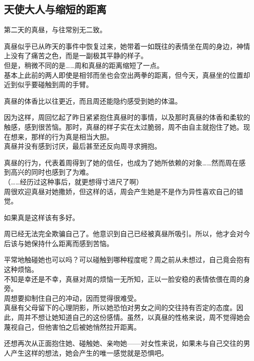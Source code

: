 \subsection{天使大人与缩短的距离}

第二天的真昼，与往常别无二致。

真昼似乎已从昨天的事件中恢复过来，她带着一如既往的表情坐在周的身边，神情上没有了痛苦之色，而是一副极其平静的样子。\\

但是，稍微不同的是……周和真昼的距离缩短了一点。\\

基本上此前的两人即使是相邻而坐也会空出两拳的距离，但今天，真昼坐的位置却近到似乎要碰触到周的手臂。

真昼的体香比以往更近，而且周还能隐约感受到她的体温。

因为这样，周回忆起了昨日紧紧抱住真昼时的事情，以及那时真昼的体香和柔软的触感，感到很苦恼。那时，真昼的样子实在太过脆弱，周不由自主就抱住了她。现在想来，那样的行为真是相当大胆。\\

真昼并没有感到讨厌，最后甚至还反向周寻求拥抱。

真昼的行为，代表着周得到了她的信任，也成为了她所依赖的对象……然而周在感到高兴的同时也感到了为难。\\

（……经历过这种事后，就更想得寸进尺了啊）\\

周很欢迎真昼对她撒娇，但这样的话，周会产生她是不是作为异性喜欢自己的错觉。

如果真是这样该有多好。

周已经无法完全欺骗自己了。他意识到自己已经被真昼所吸引。所以，他才会对今后该与她保持什么距离而感到苦恼。

平常地触碰她也可以吗？可以碰触到哪种程度呢？周之前从未想过，自己竟会抱有这种烦恼。\\

不知是幸还是不幸，真昼对周的烦恼一无所知，正以一脸安稳的表情依偎在周的身旁。\\

周想要抑制住自己的冲动，因而觉得很难受。\\

真昼有父母留下的心理阴影，所以她恐怕对男女之间的交往持有否定的态度。因此，周并不想让她知道自己的这份感情。虽然，以真昼的性格来说，周不觉得她会蔑视自己，但他害怕之后被她悄然拉开距离。

还想再次从正面抱住她、碰触她、亲吻她——对女性来说，如果未与自己交往的男人产生这样的想法，她会产生的唯一感觉就是恐惧吧。\\

